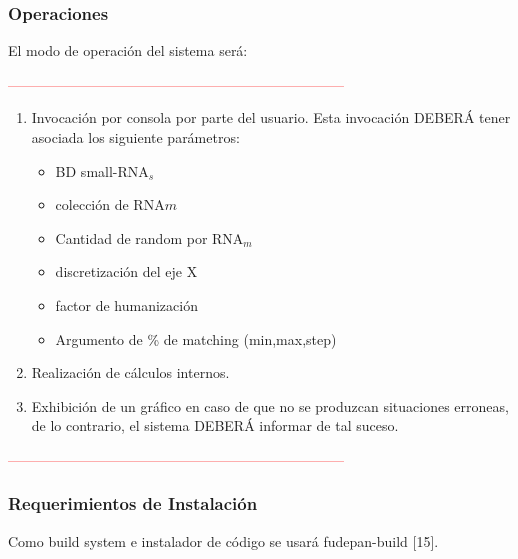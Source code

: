 \documentclass[12pt,a4paper,english,spanish]{article}
\begin{document}
	\subsubsection{Operaciones}
		El modo de operación del sistema será: 
		\par \textcolor{red}{------------------------------------------------------------------------}
		\begin{enumerate}
			\item Invocación por consola por parte del usuario. Esta invocación DEBERÁ tener asociada los siguiente parámetros:
				\begin{itemize}
					\item BD small-RNA$_s$
					\item colección de RNA$m$
					\item Cantidad de random por RNA$_m$
					\item discretización del eje X
					\item factor de humanización
					\item Argumento de \% de matching (min,max,step)
				\end{itemize}
			\item Realización de cálculos internos.
			\item Exhibición de un gráfico en caso de que no se produzcan situaciones erroneas, de lo contrario, el sistema DEBERÁ informar de tal suceso.
		\end{enumerate}
		\textcolor{red}{------------------------------------------------------------------------}

	\subsubsection{Requerimientos de Instalación}
		Como build system e instalador de código se usará fudepan-build [15].
\end{document}
